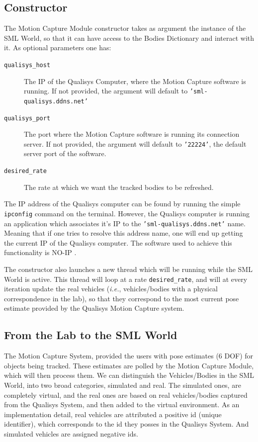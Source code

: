 \subsection{Constructor}

The Motion Capture Module constructor takes as argument the instance of the SML World, so that it can have access to the Bodies Dictionary and interact with it. As optional parameters one has:

\begin{description}
\item[\texttt{qualisys\_host}] The IP of the Qualisys Computer, where the Motion Capture software is running. If not provided, the argument will default to \texttt{'sml-qualisys.ddns.net'}
\item[\texttt{qualisys\_port}] The port where the Motion Capture software is running its connection server. If not provided, the argument will default to \texttt{'22224'}, the default server port of the software.
\item[\texttt{desired\_rate}] The rate at which we want the tracked bodies to be refreshed.
\end{description}

The IP address of the Qualisys computer can be found by running the simple \texttt{ipconfig} command on the terminal. However, the Qualisys computer is running an application which associates it's IP to the \texttt{'sml-qualisys.ddns.net'} name. Meaning that if one tries to resolve this address name, one will end up getting the current IP of the Qualisys computer. The software used to achieve this functionality is NO-IP \cite{no-ip}.

The constructor also launches a new thread which will be running while the SML World is active. This thread will loop at a rate \texttt{desired\_rate}, and will at every iteration update the real vehicles (\textit{i.e.}, vehicles/bodies with a physical correspondence in the lab), so that they correspond to the most current pose estimate provided by the Qualisys Motion Capture system.

\subsection{From the Lab to the SML World}

The Motion Capture System, provided the users with pose estimates (6 DOF) for objects being tracked. These estimates are polled by the Motion Capture Module, which will then process them. We can distinguish the Vehicles/Bodies in the SML World, into two broad categories, simulated and real. The simulated ones, are completely virtual, and the real ones are based on real vehicles/bodies captured from the Qualisys System, and then added to the virtual environment. As an implementation detail, real vehicles are attributed a positive id (unique identifier), which corresponds to the id they posses in the Qualisys System. And simulated vehicles are assigned negative ids.

